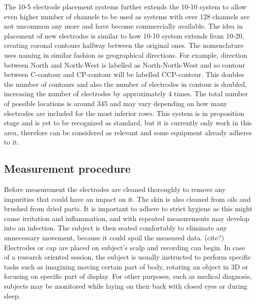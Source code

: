 The 10-5 electrode placement systems further extends the 10-10 system to allow
even higher number of channels to be used as systems with over 128 channels are
not uncommon any more and have become commercially available. The idea in
placement of new electrodes is similar to how 10-10 system extends from 10-20,
creating coronal contours halfway between the original ones. The nomenclature
uses naming in similar fashion as geographical directions. For example,
direction between North and North-West is labelled as North-North-West and so
contour between C-contour and CP-contour will be labelled CCP-contour.
This doubles the number of contours and also the number of electrodes in contour
is doubled, increasing the number of electrodes by approximately 4 times.
The total number of possible locations is around 345 and may vary depending on
how many electrodes are included for the most inferior rows. \cite{placeSys}
This system is in proposition stage and is yet to be recognized as standard, but
it is currently only work in this area, therefore can be considered as relevant
and some equipment already adheres to it.

\subsection{Measurement procedure}
Before measurement the electrodes are cleaned thoroughly to remove any
impurities that could have an impact on it. The skin is also cleaned from oils
and brushed from dried parts. It is important to adhere to strict hygiene as
this might cause irritation and inflammation, and with repeated measurements may
develop into an infection.\cite{eegFund} The subject is then seated comfortably
to eliminate any unnecessary movement, because it could spoil the measured data.
(cite?) Electrodes or cap are placed on subject's scalp and recording can begin.
In case of a research oriented session, the subject is usually instructed to
perform specific tasks such as imagining moving certain part of body, rotating
an object in 3D or focusing on specific part of display. \cite{bcComm} For other
purposes, such as medical diagnosis, subjects may be monitored while laying on
their back with closed eyes or during sleep.


